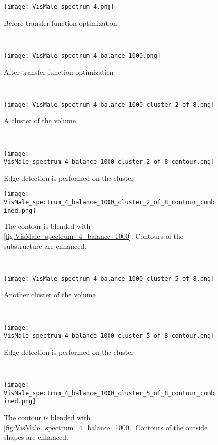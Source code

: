 \begin{figure}
	\centering
	\begin{minipage}{.24\textwidth}
		\centering
		\texttt{[image: VisMale\_spectrum\_4.png]}
		\caption{Before transfer function optimization}
		\label{fig:VisMale_spectrum_4}
	\end{minipage}~
	\begin{minipage}{.24\textwidth}
		\centering
		\texttt{[image: VisMale\_spectrum\_4\_balance\_1000.png]}
		\caption{After transfer function optimization}
		\label{fig:VisMale_spectrum_4_balance_1000}
	\end{minipage}~
	\begin{minipage}{.24\textwidth}
		\centering
		\texttt{[image: VisMale\_spectrum\_4\_balance\_1000\_cluster\_2\_of\_8.png]}
		\caption{A cluster of the volume}
		\label{fig:VisMale_spectrum_4_balance_1000_cluster_2_of_8}
	\end{minipage}~
	\begin{minipage}{.24\textwidth}
		\centering
		\texttt{[image: VisMale\_spectrum\_4\_balance\_1000\_cluster\_2\_of\_8\_contour.png]}
		\caption{Edge detection is performed on the cluster}
		\label{fig:VisMale_spectrum_4_balance_1000_cluster_2_of_8_contour}
	\end{minipage}
	\begin{minipage}{.24\textwidth}
		\centering
		\texttt{[image: VisMale\_spectrum\_4\_balance\_1000\_cluster\_2\_of\_8\_contour\_combined.png]}
		\caption{The contour is blended with \ref{fig:VisMale_spectrum_4_balance_1000}. Contours of the substructure are enhanced.}
		\label{fig:VisMale_spectrum_4_balance_1000_cluster_2_of_8_contour_combined}
	\end{minipage}~
	\begin{minipage}{.24\textwidth}
		\centering
		\texttt{[image: VisMale\_spectrum\_4\_balance\_1000\_cluster\_5\_of\_8.png]}
		\caption{Another cluster of the volume}
		\label{fig:VisMale_spectrum_4_balance_1000_cluster_5_of_8}
	\end{minipage}~
	\begin{minipage}{.24\textwidth}
		\centering
		\texttt{[image: VisMale\_spectrum\_4\_balance\_1000\_cluster\_5\_of\_8\_contour.png]}
		\caption{Edge detection is performed on the cluster}
		\label{fig:VisMale_spectrum_4_balance_1000_cluster_5_of_8_contour}
	\end{minipage}~
	\begin{minipage}{.24\textwidth}
		\centering
		\texttt{[image: VisMale\_spectrum\_4\_balance\_1000\_cluster\_5\_of\_8\_contour\_combined.png]}
		\caption{The contour is blended with \ref{fig:VisMale_spectrum_4_balance_1000}. Contours of the outside shapes are enhanced.}
		\label{fig:VisMale_spectrum_4_balance_1000_cluster_5_of_8_contour_combinedpectrum_4}
	\end{minipage}
\end{figure}


